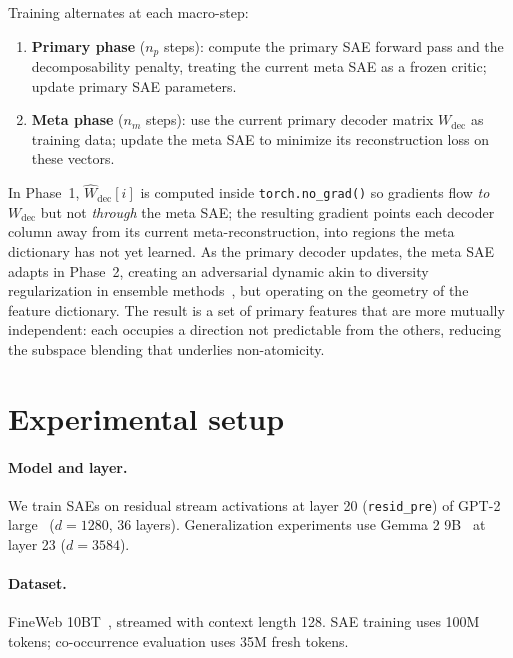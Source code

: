 \documentclass{article} %
\begin{document}
Training alternates at each macro-step:
\begin{enumerate}[topsep=2pt, itemsep=1pt]
  \item \textbf{Primary phase} ($n_p$ steps): compute the primary SAE forward
    pass and the decomposability penalty, treating the current meta SAE as a
    frozen critic; update primary SAE parameters.
  \item \textbf{Meta phase} ($n_m$ steps): use the current primary decoder matrix
    $W_\text{dec}$ as training data; update the meta SAE to minimize its
    reconstruction loss on these vectors.
\end{enumerate}
In Phase~1, $\hat{W}_\text{dec}[i]$ is computed inside \texttt{torch.no\_grad()}
so gradients flow \emph{to} $W_\text{dec}$ but not \emph{through} the meta SAE;
the resulting gradient points each decoder column away from its current
meta-reconstruction, into regions the meta dictionary has not yet learned.
As the primary decoder updates, the meta SAE adapts in Phase~2, creating an adversarial
dynamic akin to diversity regularization in ensemble methods~\citep{krogh1995neural},
but operating on the geometry of the feature dictionary.
The result is a set of primary features that are more mutually independent: each occupies
a direction not predictable from the others, reducing the subspace blending that underlies
non-atomicity.

\section{Experimental setup}
\label{sec:setup}

\paragraph{Model and layer.}
We train SAEs on residual stream activations at layer 20 (\texttt{resid\_pre})
of GPT-2 large~\citep{radford2019language} ($d = 1280$, 36 layers).
Generalization experiments use Gemma 2 9B~\citep{gemma2024} at layer 23 ($d = 3584$).

\paragraph{Dataset.}
FineWeb 10BT~\citep{fineweb2024}, streamed with context length 128.
SAE training uses 100M tokens; co-occurrence evaluation uses 35M fresh tokens.
\end{document}
